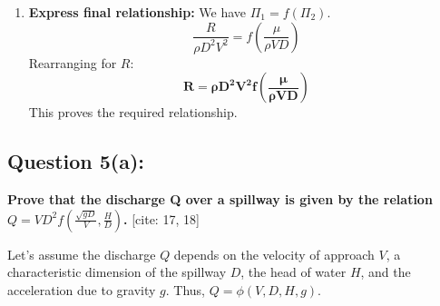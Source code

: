 \documentclass{article}
\begin{document}
\begin{enumerate}
    \item \textbf{Express final relationship:}
    We have $\Pi_1 = f(\Pi_2)$.
    $$ \frac{R}{\rho D^2 V^2} = f\left(\frac{\mu}{\rho VD}\right) $$
    Rearranging for $R$:
    $$ \mathbf{R = \rho D^2 V^2 f\left(\frac{\mu}{\rho VD}\right)} $$
    This proves the required relationship.
\end{enumerate}
\hrulefill

\subsection*{\textbf{Question 5(a):}}
\textbf{Prove that the discharge Q over a spillway is given by the relation $Q=VD^{2}f\left(\frac{\sqrt{gD}}{V},\frac{H}{D}\right)$.} [cite: 17, 18]

Let's assume the discharge $Q$ depends on the velocity of approach $V$, a characteristic dimension of the spillway $D$, the head of water $H$, and the acceleration due to gravity $g$. Thus, $Q = \phi(V, D, H, g)$.
\end{document}
